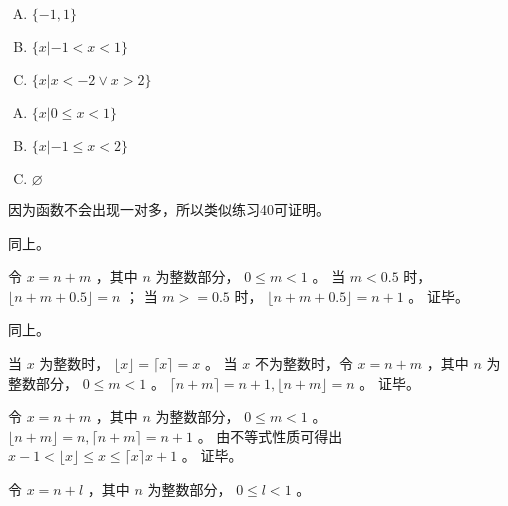 {{        %
        \begin{practices}
            \begin{enumerate}[A.]
                \item $\{-1, 1\}$
                \item $\{x | -1 < x < 1\}$
                \item $\{x | x < -2 \vee x > 2\}$
            \end{enumerate}
        \end{practices}

        \begin{practices}
            \begin{enumerate}[A.]
                \item $\{x | 0 \leq x < 1\}$
                \item $\{x | -1 \leq x < 2\}$
                \item $\varnothing$
            \end{enumerate}
        \end{practices}

        \begin{practices}
            因为函数不会出现一对多，所以类似练习40可证明。
        \end{practices}

        \begin{practices}
            同上。
        \end{practices}

        \begin{practices}
            令 $x = n + m$ ，其中 $n$ 为整数部分， $0 \leq m < 1$ 。
            当 $m < 0.5$ 时， $\lfloor n + m + 0.5 \rfloor = n$ ；
            当 $m >= 0.5$ 时， $\lfloor n + m + 0.5 \rfloor = n + 1$ 。
            证毕。
        \end{practices}

        \begin{practices}
            同上。
        \end{practices}

        \begin{practices}
            当 $x$ 为整数时， $\lfloor x \rfloor = \lceil x \rceil = x$ 。
            当 $x$ 不为整数时，令 $x = n + m$ ，其中 $n$ 为整数部分， $0 \leq m < 1$ 。 $\lceil n + m \rceil = n + 1, \lfloor n + m \rfloor = n$ 。
            证毕。
        \end{practices}

        \begin{practices}
            令 $x = n + m$ ，其中 $n$ 为整数部分， $0 \leq m < 1$ 。
            $\lfloor n + m \rfloor = n, \lceil n + m \rceil = n + 1$ 。
            由不等式性质可得出 $x - 1 < \lfloor x \rfloor \leq x \leq \lceil x \rceil x + 1$ 。
            证毕。
        \end{practices}

        \begin{practices}
            令 $x = n + l$ ，其中 $n$ 为整数部分， $0 \leq l < 1$ 。
        \end{practices}
    }
}
